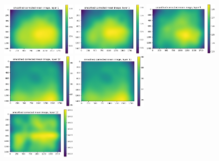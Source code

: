 \documentclass[letterpaper,11pt]{article}
\begin{document}
\begin{figure}[!ht]
\centering
\includegraphics[width=0.32\textwidth]{images/results/unmasked_smoothed_corrected_mean_image_layers_polaris/smoothed_corrected_mean_image_layer_1}
\includegraphics[width=0.32\textwidth]{images/results/unmasked_smoothed_corrected_mean_image_layers_polaris/smoothed_corrected_mean_image_layer_5}
\includegraphics[width=0.32\textwidth]{images/results/unmasked_smoothed_corrected_mean_image_layers_polaris/smoothed_corrected_mean_image_layer_9}
\includegraphics[width=0.32\textwidth]{images/results/unmasked_smoothed_corrected_mean_image_layers_polaris/smoothed_corrected_mean_image_layer_10}
\includegraphics[width=0.32\textwidth]{images/results/unmasked_smoothed_corrected_mean_image_layers_polaris/smoothed_corrected_mean_image_layer_11} \\
\includegraphics[width=0.32\textwidth]{images/results/unmasked_smoothed_corrected_mean_image_layers_polaris/smoothed_corrected_mean_image_layer_12}

\end{figure}
\end{document}
